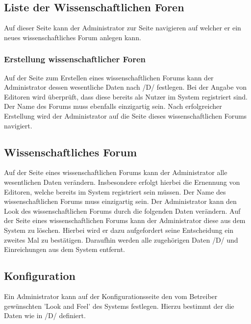 \subsection{Liste der Wissenschaftlichen Foren}
\begin{description}
     Auf dieser Seite kann der Administrator zur Seite navigieren auf welcher er ein neues
    wissenschaftliches Forum anlegen kann. %
\end{description}

\subsubsection{Erstellung wissenschaftlicher Foren}
\begin{description}
     Auf der Seite zum Erstellen eines wissenschaftlichen Forums kann der Administrator dessen
    wesentliche Daten nach /D/ %
    festlegen. Bei der Angabe von Editoren wird überprüft, dass diese bereits als Nutzer im System registriert sind.
    Der Name des Forums muss ebenfalls einzigartig sein.
    Nach erfolgreicher Erstellung wird der Administrator auf die Seite dieses wissenschaftlichen Forums
    navigiert.
\end{description}

\subsection{Wissenschaftliches Forum}
\begin{description}
     Auf der Seite eines wissenschaftlichen Forums kann der Administrator alle wesentlichen Daten
    verändern. Insbesondere erfolgt hierbei die Ernennung von Editoren, welche bereits im System
    registriert sein  müssen. Der Name des wissenschaftlichen Forums muss einzigartig sein.
     Der Administrator kann den Look des wissenschaftlichen Forums durch die folgenden Daten
    verändern. %
     Auf der Seite eines wissenschaftlichen Forums kann der Administrator diese aus dem System zu löschen.
    Hierbei wird er dazu aufgefordert seine Entscheidung ein zweites Mal zu bestätigen.
    Daraufhin werden alle zugehörigen Daten /D/ und Einreichungen aus dem System entfernt. %
\end{description}

\subsection{Konfiguration}
\begin{description}
     Ein Administrator kann auf der Konfigurationsseite den vom Betreiber gewünschten
    'Look and Feel' des Systems festlegen. Hierzu bestimmt der die Daten wie in /D/ definiert. %
\end{description}
